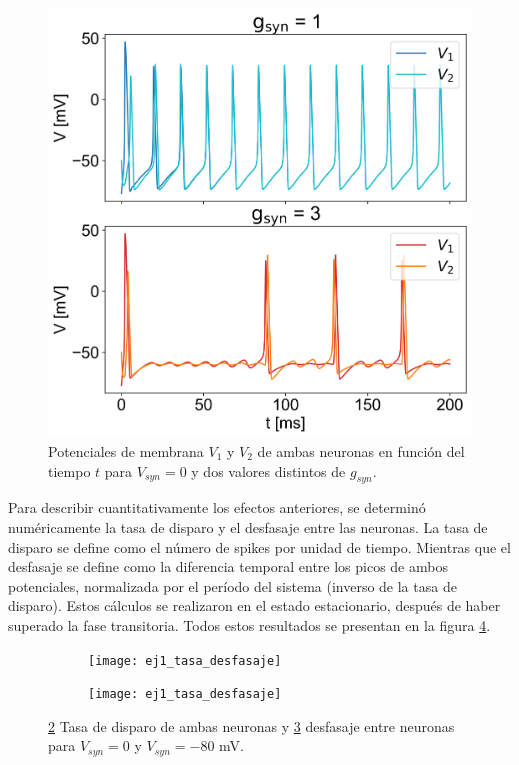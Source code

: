 \documentclass[aps,prb,twocolumn,superscriptaddress,floatfix,longbibliography]{revtex4-2}
\newcounter{para}
\begin{document}
\begin{figure}[h]
    \includegraphics[clip=true,width=\columnwidth]{ej1_potenciales_vs_gsyn}
    \caption{Potenciales de membrana $V_1$ y $V_2$ de ambas neuronas en función del tiempo $t$ para $V_{syn} = 0$ y dos valores distintos de $g_{syn}$.}
     \label{fig:ej1_potenciales_vs_gsyn}
\end{figure}

Para describir cuantitativamente los efectos anteriores, se determinó numéricamente la tasa de disparo y el desfasaje entre las neuronas. La tasa de disparo se define como el número de spikes por unidad de tiempo. Mientras que el desfasaje se define como la diferencia temporal entre los picos de ambos potenciales, normalizada por el período del sistema (inverso de la tasa de disparo). Estos cálculos se realizaron en el estado estacionario, después de haber superado la fase transitoria. Todos estos resultados se presentan en la figura \ref{fig:ej1_tasa_desfasaje}.


\begin{figure}[h]
   \centering
   \begin{subfigure}[b]{0.45\textwidth}
        \texttt{[image: ej1\_tasa\_desfasaje]}
        \label{fig:ej1_tasa}
   \end{subfigure}
    \begin{subfigure}[b]{0.45\textwidth}
          \texttt{[image: ej1\_tasa\_desfasaje]}
          \label{fig:ej1_desfasaje}
    \end{subfigure}
    \caption{\ref{fig:ej1_tasa} Tasa de disparo de ambas neuronas y \ref{fig:ej1_desfasaje} desfasaje entre neuronas para $V_{syn} = 0$ y $V_{syn} = -80$ mV.}
    \label{fig:ej1_tasa_desfasaje}
\end{figure}
\end{document}
